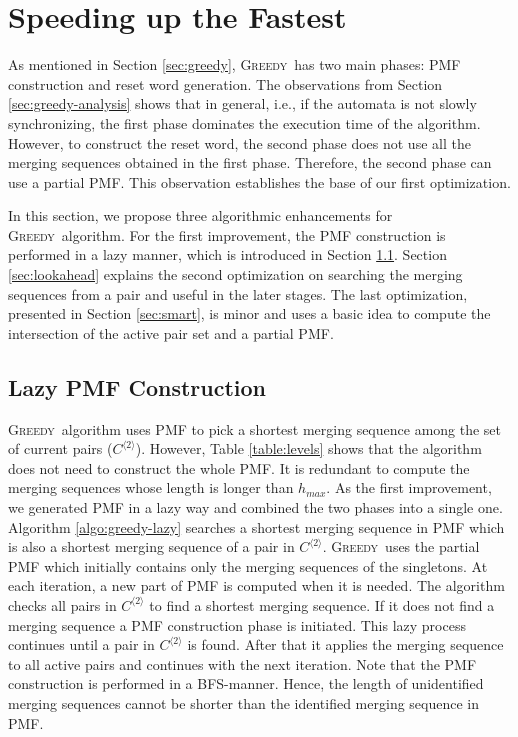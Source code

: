 \documentclass[12pt]{article}
\newcommand{\greedyAlgo}{\textsc{Greedy}}
\begin{document}
\clearpage
\section{Speeding up the Fastest}
\label{sec:speedup}

As mentioned in Section \ref{sec:greedy}, \greedyAlgo\ has two main phases: PMF construction and reset word generation. The observations from Section \ref{sec:greedy-analysis} shows that in general, i.e., if the automata is not slowly synchronizing, the first phase dominates the execution time of the algorithm. However, to construct the reset word, the second phase does not use all the merging sequences obtained in the first phase. Therefore, the second phase can use a partial PMF. This observation establishes the base of our first optimization. 

In this section, we propose three algorithmic enhancements for \greedyAlgo\ algorithm. For the first improvement, the PMF construction is performed in a lazy manner, which is introduced in Section \ref{sec:lazy}. Section \ref{sec:lookahead} explains the second optimization on searching the merging sequences from a pair and useful in the later stages. The last optimization, presented in Section \ref{sec:smart}, is minor and uses a basic idea to compute the intersection of the active pair set and a partial PMF.  

\subsection{Lazy PMF Construction}
\label{sec:lazy}

\greedyAlgo\ algorithm uses PMF to pick a shortest merging sequence among the set of current pairs ($C^{\langle2\rangle}$). However, Table \ref{table:levels} shows that the algorithm does not need to construct the whole PMF. It is redundant to compute the merging sequences whose length is longer than $h_{max}$. As the first improvement, we generated PMF in a lazy way and combined the two phases into a single one. Algorithm \ref{algo:greedy-lazy} searches a shortest merging sequence in PMF which is also a shortest merging sequence of a pair in $C^{\langle2\rangle}$. \greedyAlgo\ uses the partial PMF which initially contains only the merging sequences of the singletons. At each iteration, a new part of PMF is computed when it is needed. The algorithm checks all pairs in $C^{\langle2\rangle}$ to find a shortest merging sequence. If it does not find a merging sequence a PMF construction phase is initiated. This lazy process continues until a pair in $C^{\langle2\rangle}$ is found. After that it applies the merging sequence to all active pairs and continues with the next iteration. Note that the PMF construction is performed in a BFS-manner. Hence, the length of unidentified merging sequences cannot be shorter than the identified merging sequence in PMF.
 
\end{document}
